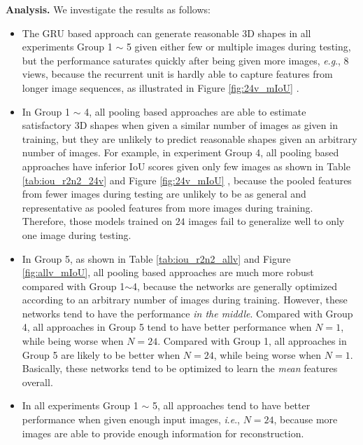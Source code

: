 \documentclass[twocolumn]{svjour3}    \pdfoutput=1
\newcommand{\ie}{\textit{i}.\textit{e}., }
\newcommand{\eg}{\textit{e}.\textit{g}., }
\newcommand*\circled[1]{\tikz[baseline=(char.base)]{
            \node[shape=circle,draw,inner sep=0.1pt] (char) {#1};}}
\begin{document}
\textbf{Analysis.} We investigate the results as follows: 
\vspace{-0.2cm}
\begin{itemize}[leftmargin=0.3cm]
\item The GRU based approach can generate reasonable 3D shapes in all experiments Group 1 $\sim$ 5 given either few or multiple images during testing, but the performance saturates quickly after being given more images, \eg 8 views, because the recurrent unit is hardly able to capture features from longer image sequences, as illustrated in Figure \ref{fig:24v_mIoU} \circled{1}.

\item In Group 1 $\sim$ 4, all pooling based approaches are able to estimate satisfactory 3D shapes when given a similar number of images as given in training, but they are unlikely to predict reasonable shapes given an arbitrary number of images. For example, in experiment Group 4, all pooling based approaches have inferior IoU scores given only few images as shown in Table \ref{tab:iou_r2n2_24v} and Figure \ref{fig:24v_mIoU} \circled{2}, because the pooled features from fewer images during testing are unlikely to be as general and representative as pooled features from more images during training. Therefore, those models trained on $24$ images fail to generalize well to only one image during testing.

\item In Group 5, as shown in Table \ref{tab:iou_r2n2_allv} and Figure \ref{fig:allv_mIoU}, all pooling based approaches are much more robust compared with Group 1$\sim$4, because the networks are generally optimized according to an arbitrary number of images during training. However, these networks tend to have the performance \textit{in the middle}. Compared with Group 4, all approaches in Group 5 tend to have better performance when $N=1$, while being worse when $N=24$. Compared with Group 1, all approaches in Group 5 are likely to be better when $N=24$, while being worse when $N=1$. Basically, these networks tend to be optimized to learn the \textit{mean} features overall.

\item  In all experiments Group 1 $\sim$ 5, all approaches tend to have better performance when given enough input images, \ie $N=24$, because more images are able to provide enough information for reconstruction.


\end{itemize}
\end{document}
